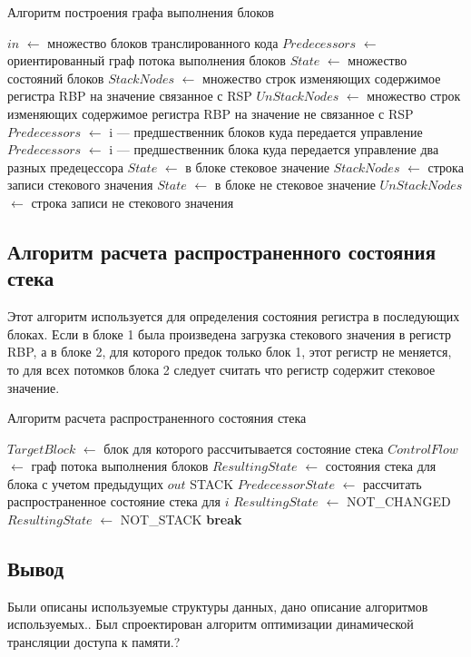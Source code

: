 \begin{algorithm}[H]
\small
	\caption{Алгоритм построения графа выполнения блоков}
	\label{alg:graph}
	\begin{algorithmic}[1]
		\State $in$ $\gets$ множество блоков транслированного кода
		\State $Predecessors$ $\gets$ ориентированный граф потока выполнения блоков
		\State $State$ $\gets$ множество состояний блоков
		\State $StackNodes$ $\gets$ множество строк изменяющих содержимое регистра RBP на значение связанное с RSP
		\State $UnStackNodes$ $\gets$ множество строк изменяющих содержимое регистра RBP на значение не связанное с RSP
		\State $Predecessors$ $\gets$ i --- предшественник блоков куда передается управление
		\EndIf
		\State $Predecessors$ $\gets$ i --- предшественник блока куда передается управление два разных предецессора
		\EndIf
		\State $State$ $\gets$ в блоке стековое значение
		\State $StackNodes$ $\gets$ строка записи стекового значения
		\Else
		\State $State$ $\gets$ в блоке не стековое значение
		\State $UnStackNodes$ $\gets$ строка записи не стекового значения
		\EndIf
		\EndIf
		\EndFor
		\EndFor
	\end{algorithmic}
\end{algorithm}

\subsection{Алгоритм расчета распространенного состояния стека}

Этот алгоритм используется для определения состояния регистра в последующих блоках. Если в блоке 1 была произведена загрузка стекового значения в регистр RBP, а в блоке 2, для которого предок только блок 1, этот регистр не меняется, то для всех потомков блока 2 следует считать что регистр содержит стековое значение.

\begin{algorithm}[H]
\small
	\caption{Алгоритм расчета распространенного состояния стека}
	\label{alg:bilin}
	\begin{algorithmic}[1]
		\State $TargetBlock$ $\gets$ блок для которого рассчитывается состояние стека
		\State $ControlFlow$ $\gets$ граф потока выполнения блоков
		\State $ResultingState$ $\gets$ состояния стека для блока с учетом предыдущих
		\State $out$ STACK
		\State $PredecessorState$ $\gets$ рассчитать распространенное состояние стека для $i$
		\State $ResultingState$ $\gets$ NOT\_CHANGED
		\EndIf
		\State $ResultingState$ $\gets$ NOT\_STACK
		\State \textbf{break}
		\EndIf
		\EndFor
	\end{algorithmic}
\end{algorithm}

\subsection{Вывод}

Были описаны используемые структуры данных, дано описание алгоритмов используемых.. Был спроектирован алгоритм оптимизации динамической трансляции доступа к памяти.?

\pagebreak